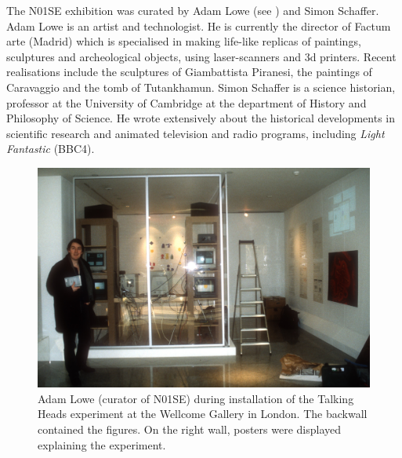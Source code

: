 The N01SE exhibition was curated by Adam Lowe (see ) and Simon Schaffer. 
Adam Lowe is an artist and technologist. He is currently the director of Factum arte (Madrid) which is specialised 
in making life-like replicas of paintings, sculptures and archeological objects, using laser-scanners and 3d printers. 
Recent realisations include the sculptures of Giambattista Piranesi\cite{Lowe:2010}, the 
paintings of Caravaggio and the tomb of Tutankhamun. 
Simon Schaffer is a science historian, professor at the University of Cambridge at the department of History and Philosophy 
of Science. He wrote extensively about the historical developments in scientific research\cite{Schaffer:2011}
and animated television and radio programs, including {\itshape Light Fantastic} (BBC4). 
\begin{figure}[htbp]
  \centerline{\includegraphics[width=.70\textwidth]{chap9/figs/lowe}}
\caption{\label{fig:lowe} 
Adam Lowe (curator of N01SE) during installation of the Talking Heads experiment at the Wellcome Gallery in London. 
The backwall contained the figures. On the right wall, posters were displayed explaining the experiment.}
\end{figure}

